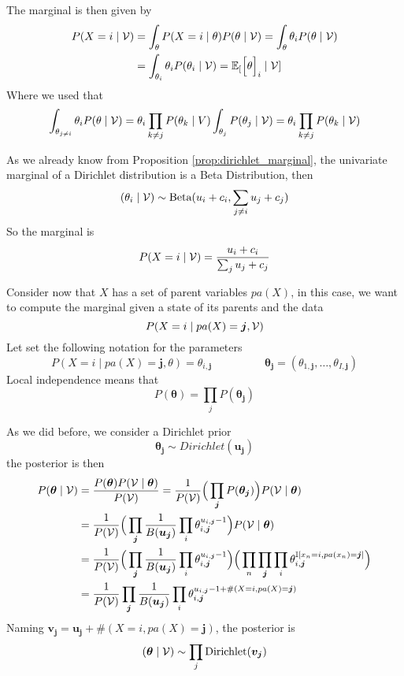 The marginal is then given by
\[
  \begin{aligned}
    P(X=i \mid \mathcal{V}) &= \int_{\theta}P(X=i \mid \theta)P(\theta \mid \mathcal{V}) =  \int_{\theta}\theta_{i}P(\theta \mid \mathcal{V})\\
    &=  \int_{\theta_{i}}\theta_{i}P(\theta_{i} \mid \mathcal{V}) = \mathbb{E}_{[}\Big[\theta\Big]_{i} \mid \mathcal{V}]
\end{aligned}
\]
Where we used that
\[\int_{\theta_{j \neq i}}\theta_{i} P(\theta \mid \mathcal{V}) = \theta_{i}\prod_{k\neq j}P(\theta_{k} \mid V) \int_{\theta_{j}}P(\theta_{j}\mid \mathcal{V}) = \theta_{i} \prod_{k \neq j}P(\theta_{k} \mid \mathcal{V})\]


As we already know from Proposition \ref{prop:dirichlet_marginal}, the univariate marginal of a Dirichlet distribution is a
Beta Distribution, then
\[
  (\theta_{i} \mid \mathcal{V}) \sim \text{Beta}(u_{i} + c_{i}, \sum_{j\neq i} u_{j} + c_{j})
\]
So the marginal is
\[
  P(X = i \mid \mathcal{V}) = \frac{u_{i} + c_{i}}{\sum_{j}u_{j} + c_{j}}
\]


Consider now that \(X\) has a set of parent variables \(pa(X)\), in this case,
we want to compute the marginal given a state of its parents and the data
\[
  P(X = i \mid pa(X) = \bm{j}, \mathcal{V})
\]
Let set the following notation for the parameters
\[
  P(X = i \mid pa(X) = \bm{j}, \theta) = \theta_{i,\bm{j}} \hspace{2cm} \bm{\theta_{j}} = (\theta_{1,\bm{j}},\dots, \theta_{I,\bm{j}})
\]
Local independence means that
\[
  P(\bm{\theta}) = \prod_{j}P(\bm{\theta_{j}})
\]

As we did before, we consider a Dirichlet prior
\[
  \bm{\theta_{j}} \sim Dirichlet(\bm{u_{j}})
\]
the posterior is then
\[
  \begin{aligned}
    P(\bm{\theta} \mid \mathcal{V}) &= \frac{P(\bm{\theta})P(\mathcal{V} \mid \bm{\theta}) }{P(\mathcal{V})} = \frac{1}{P(\mathcal{V})}\Big(\prod_{\bm{j}}P(\bm{\theta_{j}}) \Big)P(\mathcal{V} \mid \bm{\theta}) \\
    &= \frac{1}{P(\mathcal{V})}\Big(\prod_{\bm{j}}\frac{1}{B(\bm{u_{j}})}\prod_{i}\theta_{i,\bm{j}}^{u_{i,\bm{j}}-1}\Big) P(\mathcal{V} \mid \bm{\theta})\\
    &= \frac{1}{P(\mathcal{V})}\Big(\prod_{\bm{j}}\frac{1}{B(\bm{u_{j}})}\prod_{i}\theta_{i,\bm{j}}^{u_{i,\bm{j}}-1}\Big) \Big(\prod_{n}\prod_{\bm{j}}\prod_{i} \theta_{i,\bm{j}}^{\mathbb{I}[x_{n} = i, pa(x_{n}) = \bm{j}]}\Big)\\
    &= \frac{1}{P(\mathcal{V})}\prod_{\bm{j}}\frac{1}{B(\bm{u_{j}})}\prod_{i}\theta_{i,\bm{j}}^{u_{i,\bm{j}}-1 + \#(X = i,pa(X)=\bm{j})}
  \end{aligned}
\]
Naming \(\bm{v_{j}} = \bm{u_{j}} + \#(X = i, pa(X) = \bm{j})\), the posterior
is
\[
  (\bm{\theta} \mid \mathcal{V}) \sim \prod_{j}\text{Dirichlet}(\bm{v_{j}})
\]

